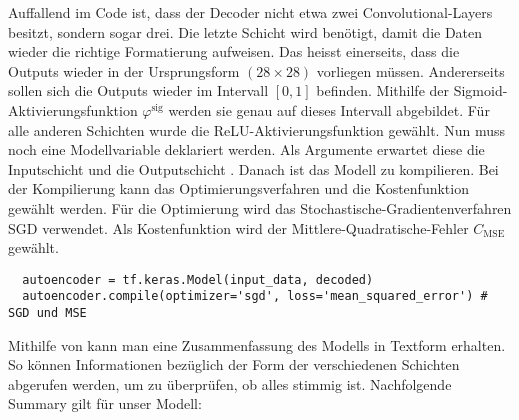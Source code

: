 Auffallend im Code ist, dass der Decoder nicht etwa zwei Convolutional-Layers
besitzt, sondern sogar drei. Die letzte Schicht wird benötigt, damit
die Daten wieder die richtige Formatierung aufweisen. Das heisst einerseits,
dass die Outputs wieder in der Ursprungsform $(28 \times 28)$ vorliegen müssen.
Andererseits sollen sich die Outputs wieder im Intervall
$[0,1]$ befinden. Mithilfe der Sigmoid-Aktivierungsfunktion $\varphi^{\text{sig}}$ werden
sie genau auf dieses Intervall abgebildet.
Für alle anderen Schichten wurde die ReLU-Aktivierungsfunktion gewählt.
\para{}
Nun muss noch eine Modellvariable deklariert werden. Als Argumente erwartet
diese die Inputschicht  und die Outputschicht .
Danach ist das Modell zu kompilieren. Bei der Kompilierung kann das
Optimierungsverfahren und die Kostenfunktion gewählt werden. Für die Optimierung
wird das Stochastische-Gradientenverfahren SGD verwendet.
Als Kostenfunktion wird der Mittlere-Quadratische-Fehler $C_{\text{MSE}}$ gewählt.
\begin{verbatim}
  autoencoder = tf.keras.Model(input_data, decoded)
  autoencoder.compile(optimizer='sgd', loss='mean_squared_error') # SGD und MSE
\end{verbatim}
Mithilfe von  kann man eine Zusammenfassung des
Modells in Textform erhalten. So können Informationen bezüglich der Form der
verschiedenen Schichten abgerufen werden, um zu überprüfen, ob alles stimmig ist.
Nachfolgende Summary gilt für unser Modell:
